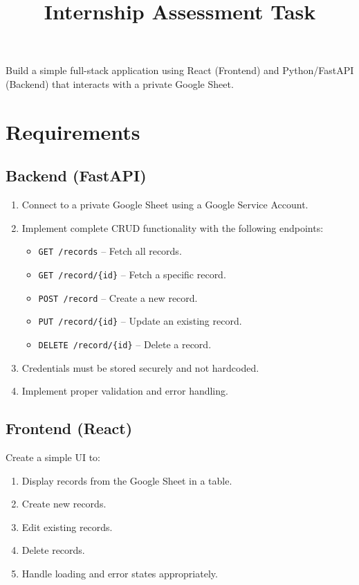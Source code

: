 \documentclass[11pt]{article}
\title{Internship Assessment Task}
\date{}
\author{}
\begin{document}
\maketitle
\vspace{-2em}

Build a simple full-stack application using React (Frontend) and Python/FastAPI (Backend) that interacts with a private Google Sheet.

\section*{Requirements}

\subsection*{Backend (FastAPI)}
\begin{enumerate}[topsep=2pt, itemsep=2pt]
    \item Connect to a private Google Sheet using a Google Service Account.
    \item Implement complete CRUD functionality with the following endpoints:
    \begin{itemize}[topsep=2pt, itemsep=2pt]
        \item \texttt{GET /records} -- Fetch all records.
        \item \texttt{GET /record/\{id\}} -- Fetch a specific record.
        \item \texttt{POST /record} -- Create a new record.
        \item \texttt{PUT /record/\{id\}} -- Update an existing record.
        \item \texttt{DELETE /record/\{id\}} -- Delete a record.
    \end{itemize}
    \item Credentials must be stored securely and not hardcoded.
    \item Implement proper validation and error handling.
\end{enumerate}

\subsection*{Frontend (React)}
Create a simple UI to:
\begin{enumerate}[topsep=2pt, itemsep=2pt]
    \item Display records from the Google Sheet in a table.
    \item Create new records.
    \item Edit existing records.
    \item Delete records.
    \item Handle loading and error states appropriately.
\end{enumerate}
\end{document}
